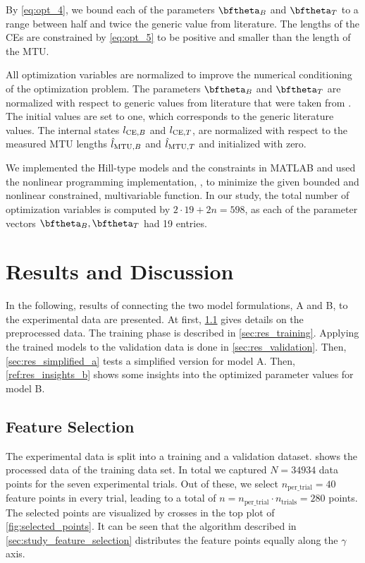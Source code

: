 By \cref{eq:opt_4}, we bound each of the parameters $\bftheta_B$ and $\bftheta_T$ to a range between half and twice the generic value from literature.
The lengths of the CEs are constrained by \cref{eq:opt_5} to be positive and smaller than the length of the MTU.

All optimization variables are normalized to improve the numerical conditioning of the optimization problem. 
The parameters $\bftheta_B$ and $\bftheta_T$ are normalized with respect to generic values from literature that were taken from \cite{Gunther2007, Morl2012, Hilltype2014}. The initial values are set to one, which corresponds to the generic literature values.
The internal states $l_{\text{CE},B}$ and $l_{\text{CE},T}$, are normalized with respect to the measured MTU lengths $\hat{l}_{\text{MTU},B}$ and $\hat{l}_{\text{MTU},T}$ and initialized with zero.

We implemented the Hill-type models and the constraints in MATLAB and used the nonlinear programming implementation, , to minimize the given bounded and nonlinear constrained, multivariable function.
In our study, the total number of optimization variables is computed by $2\cdot 19 + 2n = 598$, as each of the parameter vectors $\bftheta_B,\bftheta_T$ had 19 entries. 

\section{Results and Discussion}\label{sec:evaluation}

In the following, results of connecting the two model formulations, A and B, to the experimental data are presented.
At first, \cref{sec:res_feature_selection} gives details on the preprocessed data. The training phase is described in \cref{sec:res_training}. Applying the trained models to the validation data is done in \cref{sec:res_validation}. Then, \cref{sec:res_simplified_a} tests a simplified version for model A. Then, \cref{ref:res_insights_b} shows some insights into the optimized parameter values for model B.

\subsection{Feature Selection}\label{sec:res_feature_selection}
The experimental data is split into a training and a validation dataset.  shows the processed data of the training data set. In total we captured $N=\num{34934}$ data points for the seven experimental trials. Out of these, we select $n_\text{per\_trial}=\num{40}$ feature points in every trial, leading to a total of $n=n_\text{per\_trial}\cdot n_\text{trials}=\num{280}$ points. The selected points are visualized by crosses in the top plot of \cref{fig:selected_points}. It can be seen that the algorithm described in \cref{sec:study_feature_selection} distributes the feature points equally along the $\gamma$ axis.


